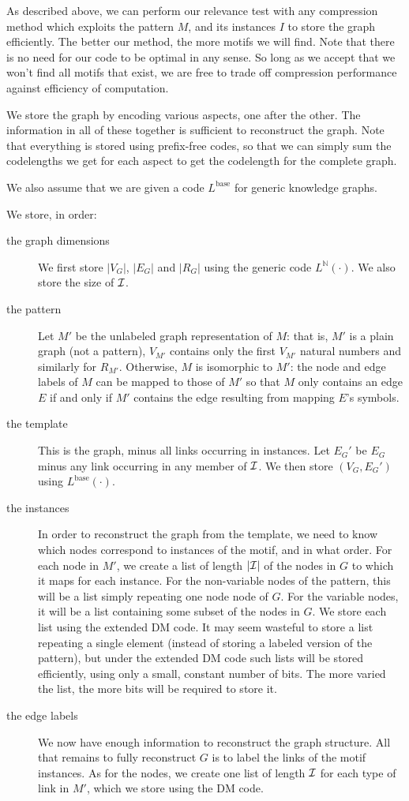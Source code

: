 \documentclass[11pt]{article}
\newcommand{\N}{{\mathbb N}}
\newcommand{\I}{{\cal I}}
\begin{document}
As described above, we can perform our relevance test with any compression method which exploits the pattern $M$, and its instances $I$ to store the graph efficiently. The better our method, the more motifs we will find. Note that there is no need for our code to be optimal in any sense. So long as we accept that we won't find all motifs that exist, we are free to trade off compression performance against efficiency of computation.

We store the graph by encoding various aspects, one after the other. The information in all of these together is sufficient to reconstruct the graph. Note that everything is stored using prefix-free codes, so that we can simply sum the codelengths we get for each aspect to get the codelength for the complete graph.

We also assume that we are given a code $L^\text{base}$ for generic knowledge graphs.

We store, in order:

\begin{description}
 \item[the graph dimensions] We first store $|V_G|$, $|E_G|$ and $|R_G|$ using the generic code $L^{\N}(\cdot)$. We also store the size of $\I$.
 \item[the pattern] Let $M'$ be the unlabeled graph representation of $M$: that is, $M'$ is a plain graph (not a pattern), $V_{M'}$ contains only the first $V_{M'}$ natural numbers and similarly for $R_{M'}$. Otherwise, $M$ is isomorphic to $M'$: the node and edge labels of $M$ can be mapped to those of $M'$ so that $M$ only contains an edge $E$ if and only if $M'$ contains the edge resulting from mapping $E$'s symbols. 
 \item[the template] This is the graph, minus all links occurring in  instances. Let $E_G'$ be $E_G$ minus any link occurring in any member of $\cal I$. We then store $(V_G, E_G')$ using $L^\text{base}(\cdot)$.
 \item[the instances] In order to reconstruct the graph from the template, we need to know which nodes correspond to instances of the motif, and in what order. For each node in $M'$, we create a list of length $\cal |I|$ of the nodes in $G$ to which it maps for each instance. For the non-variable nodes of the pattern, this will be a list simply repeating one node node of $G$. For the variable nodes, it will be a list containing some subset of the nodes in $G$.
 We store each list using the extended DM code. It may seem wasteful to store a list repeating a single element (instead of storing a labeled version of the pattern), but under the extended DM code such lists will be stored efficiently, using only a small, constant number of bits. The more varied the list, the more bits will be required to store it.
 \item[the edge labels] We now have enough information to reconstruct the graph structure. All that remains to fully reconstruct $G$ is to label the links of the motif instances. As for the nodes, we create one list of length $\cal I$ for each type of link in $M'$, which we store using the DM code.
\end{description}
\end{document}
